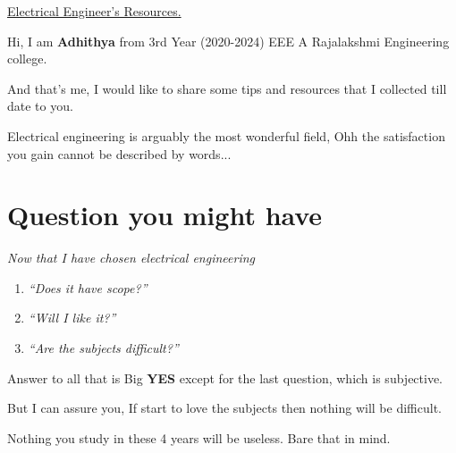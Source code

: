 \documentclass[a4paper,12pt]{article}
\begin{document}
\begin{center}

{\Huge\textsf{\underline{Electrical Engineer's Resources.}}}
\end{center}

\vspace{0.7in}



Hi, I am \textbf{Adhithya} from 3rd Year (2020-2024) EEE A Rajalakshmi Engineering college.
\begin{center}
\end{center}
And that's me, I would like to share some tips and resources that I collected till date to you.

Electrical engineering is arguably the most wonderful field, Ohh the satisfaction you gain cannot be described by words...


\section{Question you might have}


\textit{Now that I have chosen electrical engineering}
\begin{enumerate}
\item \textit{``Does it have scope?''}
\item \textit{``Will I like it?''}
\item \textit{``Are the subjects difficult?''}
\end{enumerate}

Answer to all that is Big {\large\textbf{YES}} except for the last question, which is subjective.

But I can assure you, If start to love the subjects then nothing will be difficult.

Nothing you study in these 4 years will be useless. Bare that in mind. 
\end{document}
